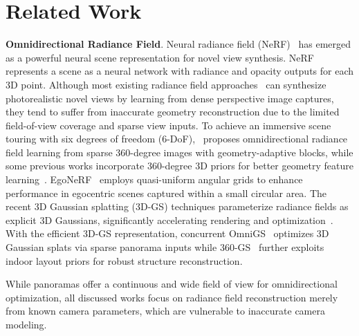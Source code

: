 \section{Related Work}
\textbf{Omnidirectional Radiance Field}.
Neural radiance field (NeRF)~\citep{mildenhall2020nerf} has emerged as a powerful neural scene representation for novel view synthesis. NeRF represents a scene as a neural network with radiance and opacity outputs for each 3D point. Although most existing radiance field approaches~\citep{chen2022tensorf, barron2023zipnerf, dvgo, pointnerf} can synthesize photorealistic novel views by learning from dense perspective image captures, they tend to suffer from inaccurate geometry reconstruction due to the limited field-of-view coverage and sparse view inputs. 
To achieve an immersive scene touring with six degrees of freedom (6-DoF),~\citet{huang2022360roam} proposes omnidirectional radiance field learning from sparse 360-degree images with geometry-adaptive blocks, while some previous works incorporate 360-degree 3D priors for better geometry feature learning~\citep{chen2023panogrf, kulkarni2023360fusionnerf, perf2023}. EgoNeRF~\citep{choi2023balanced} employs quasi-uniform angular grids to enhance performance in egocentric scenes captured within a small circular area.
The recent 3D Gaussian splatting (3D-GS) techniques parameterize radiance fields as explicit 3D Gaussians, significantly accelerating rendering and optimization~\citep{kerbl20233dgs}. 
With the efficient 3D-GS representation, concurrent OmniGS~\citep{li2024omnigs} optimizes 3D Gaussian splats via sparse panorama inputs while 360-GS~\citep{bai2024360} further exploits indoor layout priors for robust structure reconstruction. 

While panoramas offer a continuous and wide field of view for omnidirectional optimization, all discussed works focus on radiance field reconstruction merely from known camera parameters, which are vulnerable to inaccurate camera modeling.

